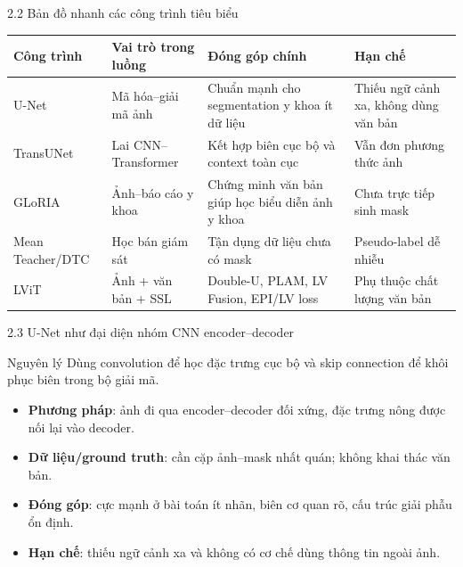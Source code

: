 \documentclass[aspectratio=169,11pt]{beamer}
\begin{document}
\begin{frame}{2.2 Bản đồ nhanh các công trình tiêu biểu}
  \begin{table}
    \centering
    \scriptsize
    \begin{tabularx}{\textwidth}{@{}l X X X@{}}
      \toprule
      Công trình & Vai trò trong luồng & Đóng góp chính & Hạn chế \\
      \midrule
      U-Net & Mã hóa--giải mã ảnh & Chuẩn mạnh cho segmentation y khoa ít dữ liệu & Thiếu ngữ cảnh xa, không dùng văn bản \\
      TransUNet & Lai CNN--Transformer & Kết hợp biên cục bộ và context toàn cục & Vẫn đơn phương thức ảnh \\
      GLoRIA & Ảnh--báo cáo y khoa & Chứng minh văn bản giúp học biểu diễn ảnh y khoa & Chưa trực tiếp sinh mask \\
      Mean Teacher/DTC & Học bán giám sát & Tận dụng dữ liệu chưa có mask & Pseudo-label dễ nhiễu \\
      LViT & Ảnh + văn bản + SSL & Double-U, PLAM, LV Fusion, EPI/LV loss & Phụ thuộc chất lượng văn bản \\
      \bottomrule
    \end{tabularx}
  \end{table}
\end{frame}

\begin{frame}{2.3 U-Net như đại diện nhóm CNN encoder--decoder}
  \begin{block}{Nguyên lý}
    Dùng convolution để học đặc trưng cục bộ và skip connection để khôi phục biên trong bộ giải mã.
  \end{block}
  \begin{itemize}
    \item \textbf{Phương pháp}: ảnh đi qua encoder--decoder đối xứng, đặc trưng nông được nối lại vào decoder.
    \item \textbf{Dữ liệu/ground truth}: cần cặp ảnh--mask nhất quán; không khai thác văn bản.
    \item \textbf{Đóng góp}: cực mạnh ở bài toán ít nhãn, biên cơ quan rõ, cấu trúc giải phẫu ổn định.
    \item \textbf{Hạn chế}: thiếu ngữ cảnh xa và không có cơ chế dùng thông tin ngoài ảnh.
  \end{itemize}
\end{frame}
\end{document}
